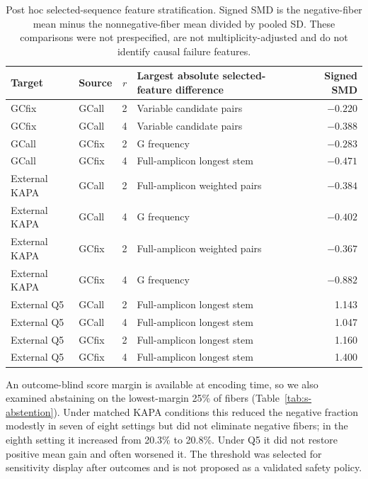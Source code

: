 \documentclass[10pt]{article}
\begin{document}
\begin{table}[H]
\centering
\scriptsize
\begin{tabular}{llrlr}
\toprule
Target & Source & $r$ & Largest absolute selected-feature difference & Signed SMD\\
\midrule
GCfix & GCall & 2 & Variable candidate pairs & $-0.220$\\
GCfix & GCall & 4 & Variable candidate pairs & $-0.388$\\
GCall & GCfix & 2 & G frequency & $-0.283$\\
GCall & GCfix & 4 & Full-amplicon longest stem & $-0.471$\\
External KAPA & GCall & 2 & Full-amplicon weighted pairs & $-0.384$\\
External KAPA & GCall & 4 & G frequency & $-0.402$\\
External KAPA & GCfix & 2 & Full-amplicon weighted pairs & $-0.367$\\
External KAPA & GCfix & 4 & G frequency & $-0.882$\\
External Q5 & GCall & 2 & Full-amplicon longest stem & 1.143\\
External Q5 & GCall & 4 & Full-amplicon longest stem & 1.047\\
External Q5 & GCfix & 2 & Full-amplicon longest stem & 1.160\\
External Q5 & GCfix & 4 & Full-amplicon longest stem & 1.400\\
\bottomrule
\end{tabular}
\caption{Post hoc selected-sequence feature stratification. Signed SMD is the negative-fiber mean minus the nonnegative-fiber mean divided by pooled SD. These comparisons were not prespecified, are not multiplicity-adjusted and do not identify causal failure features.}
\label{tab:s-negative-feature}
\end{table}

An outcome-blind score margin is available at encoding time, so we also examined abstaining on the lowest-margin 25\% of fibers (Table~\ref{tab:s-abstention}). Under matched KAPA conditions this reduced the negative fraction modestly in seven of eight settings but did not eliminate negative fibers; in the eighth setting it increased from 20.3\% to 20.8\%. Under Q5 it did not restore positive mean gain and often worsened it. The threshold was selected for sensitivity display after outcomes and is not proposed as a validated safety policy.
\end{document}
